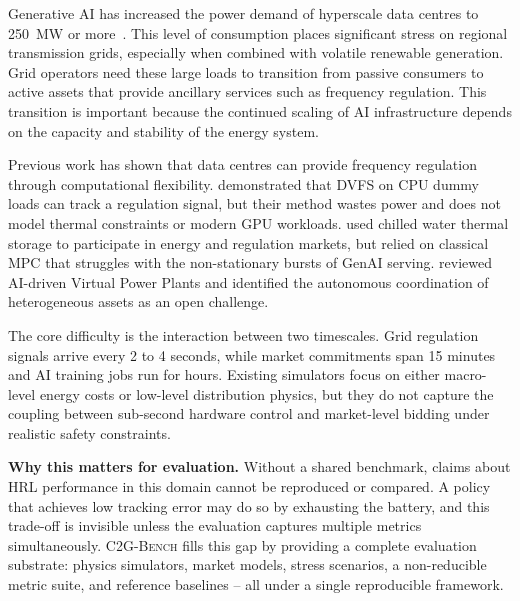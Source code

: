 \documentclass{article}
\newcommand{\cname}{\textsc{C2G-Bench}}
\begin{document}
Generative AI has increased the power demand of hyperscale data centres to
250~MW or more~\citep{iea2024datacenters}.
This level of consumption places significant stress on regional transmission
grids, especially when combined with volatile renewable generation.
Grid operators need these large loads to transition from passive consumers to
active assets that provide ancillary services such as frequency regulation.
This transition is important because the continued scaling of AI infrastructure
depends on the capacity and stability of the energy system.

Previous work has shown that data centres can provide frequency regulation
through computational flexibility.
\citet{wang2019frequency} demonstrated that DVFS on CPU dummy loads can track
a regulation signal, but their method wastes power and does not model thermal
constraints or modern GPU workloads.
\citet{fu2021multistage} used chilled water thermal storage to participate in
energy and regulation markets, but relied on classical MPC that struggles with
the non-stationary bursts of GenAI serving.
\citet{li2026aivpp} reviewed AI-driven Virtual Power Plants and identified
the autonomous coordination of heterogeneous assets as an open challenge.

The core difficulty is the interaction between two timescales.
Grid regulation signals arrive every 2 to 4 seconds, while market commitments
span 15 minutes and AI training jobs run for hours.
Existing simulators focus on either macro-level energy costs or low-level
distribution physics, but they do not capture the coupling between sub-second
hardware control and market-level bidding under realistic safety constraints.

\textbf{Why this matters for evaluation.}
Without a shared benchmark, claims about HRL performance in this domain cannot
be reproduced or compared.
A policy that achieves low tracking error may do so by exhausting the battery,
and this trade-off is invisible unless the evaluation captures multiple metrics
simultaneously.
\cname{} fills this gap by providing a complete evaluation substrate: physics
simulators, market models, stress scenarios, a non-reducible metric suite,
and reference baselines -- all under a single reproducible framework.
\end{document}
